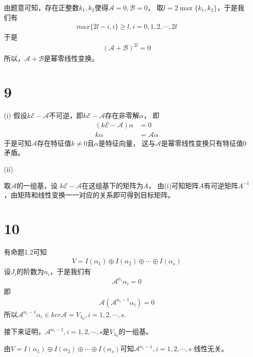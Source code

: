 \documentclass{article}
\begin{document}
由题意可知，存在正整数$k_1, k_2$使得$\mathscr{A} = 0, \mathscr{B} = 0$，
取$l = 2 \max\{k_1, k_2\}$，于是我们有
\begin{align*}
  max\{2l - i, i\} \geq l, i = 0, 1, 2, \cdots, 2l
\end{align*}
于是
\begin{align*}
  (\mathscr{A} + \mathscr{B})^{2l} = 0
\end{align*}
所以，$\mathscr{A} + \mathscr{B}$是幂零线性变换。

\section*{9}

 (i)
假设$k \mathscr{E} - \mathscr{A}$不可逆，即$k \mathscr{E} - \mathscr{A}$存在非零解$\alpha$，
即
\begin{align*}
  (k \mathscr{E} - \mathscr{A}) \alpha & = 0                   \\
  k \alpha                             & =  \mathscr{A} \alpha
\end{align*}
于是可知$\mathscr{A}$存在特征值$k \neq 0$且$\alpha$是特征向量，
这与$\mathscr{A}$是幂零线性变换只有特征值0矛盾。

(ii)

取$\mathscr{A}$的一组基，设
$k \mathscr{E} - \mathscr{A}$在这组基下的矩阵为$A$，
由(i)可知矩阵$A$有可逆矩阵$A^{-1}$，由矩阵和线性变换一一对应的关系即可得到目标矩阵。

\section*{10}

有命题1.2可知
\begin{align*}
  V = I(\alpha_1) \oplus I(\alpha_2) \oplus \cdots \oplus I(\alpha_s)
\end{align*}
设$J_i$的阶数为$n_i$，于是我们有
\begin{align*}
  \mathscr{A}^{n_i} \alpha_i = 0
\end{align*}
即
\begin{align*}
  \mathscr{A} (\mathscr{A}^{n_i - 1} \alpha_i) = 0
\end{align*}
所以$\mathscr{A}^{n_i - 1} \alpha_i \in ker \mathscr{A} = V_{\lambda_0}, i = 1, 2, \cdots, s$.

接下来证明，$\mathscr{A}^{n_i - 1}, i = 1, 2, \cdots, s$是$V_{\lambda_0}$的一组基。

由$V = I(\alpha_1) \oplus I(\alpha_2) \oplus \cdots \oplus I(\alpha_s)$可知$\mathscr{A}^{n_i - 1}, i = 1, 2, \cdots, s$
线性无关。
\end{document}

